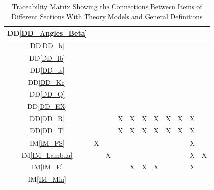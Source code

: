 \documentclass[12pt]{article}
\newcommand{\iref}[1]{IM\ref{#1}}
\newcommand{\ddref}[1]{DD\ref{#1}}
\begin{document}
{\begin{landscape}
\begin{table}[h!]
\begin{tabular}{|c|c|c|c|c|c|c|c|c|c|c|}
\ddref{DD_Angles_Beta}  & & & & & & & & & & \\ \hline
\ddref{DD_b}            & & & & & & & & & & \\ \hline
\ddref{DD_lb}           & & & & & & & & & & \\ \hline
\ddref{DD_ls}           & & & & & & & & & & \\ \hline
\ddref{DD_Kc}           & & & & & & & & & & \\ \hline
\ddref{DD_Q}            & & & & & & & & & & \\ \hline
\ddref{DD_EX}           & & & & & & & & & & \\ \hline
\ddref{DD_R}            & & & X& X& X& X& X& X& X& \\ \hline
\ddref{DD_T}            & & & X& X& X& X& X& X& X& \\ \hline
\iref{IM_FS}            & X& & & & & & & & X& \\ \hline
\iref{IM_Lambda}        & & X& & & & & & & X& X\\ \hline
\iref{IM_E}             & & & & X& X& X& & & X& \\ \hline
\iref{IM_Min}           & & & & & & & & & & \\
\hline
\end{tabular}
\caption{Traceability Matrix Showing the Connections Between Items of Different 
Sections With Theory Models and General Definitions}
\label{Table:trace}
\end{table}
\end{landscape}
}
\end{document}
